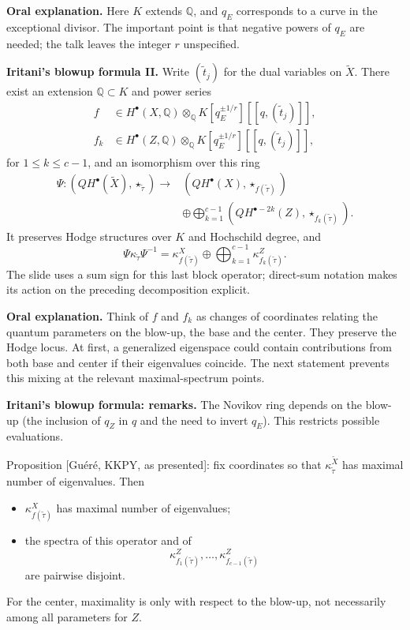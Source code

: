 \textbf{Oral explanation.}
Here $K$ extends $\mathbb Q$, and $q_E$
corresponds to a curve in the exceptional
divisor. The important point is that
negative powers of $q_E$ are needed;
the talk leaves the integer $r$ unspecified.

\medskip\noindent
\textbf{Iritani's blowup formula II.}
Write $(\widetilde t_j)$ for the dual
variables on $\widetilde X$.
There exist an extension
$\mathbb Q\subset K$ and power series
$$
\begin{aligned}
f&\in H^\bullet(X,\mathbb Q)
\otimes_{\mathbb Q}
K[q_E^{\pm1/r}][[q,(\widetilde t_j)]],\\
f_k&\in H^\bullet(Z,\mathbb Q)
\otimes_{\mathbb Q}
K[q_E^{\pm1/r}][[q,(\widetilde t_j)]],
\end{aligned}
$$
for $1\leq k\leq c-1$, and an isomorphism
over this ring
$$
\begin{aligned}
\Psi:(QH^\bullet(\widetilde X),
\star_{\widetilde\tau})
\longrightarrow{}&
(QH^\bullet(X),\star_{f(\widetilde\tau)})\\
&\oplus\bigoplus_{k=1}^{c-1}
(QH^{\bullet-2k}(Z),
\star_{f_k(\widetilde\tau)}).
\end{aligned}
$$
It preserves Hodge structures over $K$
and Hochschild degree, and
$$
\Psi\kappa_{\widetilde\tau}\Psi^{-1}
=
\kappa^X_{f(\widetilde\tau)}
\oplus\bigoplus_{k=1}^{c-1}
\kappa^Z_{f_k(\widetilde\tau)}.
$$
The slide uses a sum sign for this last
block operator; direct-sum notation makes
its action on the preceding decomposition
explicit.

\textbf{Oral explanation.}
Think of $f$ and $f_k$ as changes of
coordinates relating the quantum parameters
on the blow-up, the base and the center.
They preserve the Hodge locus.
At first, a generalized eigenspace could
contain contributions from both base and
center if their eigenvalues coincide.
The next statement prevents this mixing
at the relevant maximal-spectrum points.

\medskip\noindent
\textbf{Iritani's blowup formula: remarks.}
The Novikov ring depends on the blow-up
(the inclusion of $q_Z$ in $q$ and the
need to invert $q_E$). This restricts
possible evaluations.

Proposition [Gu\'er\'e, KKPY, as presented]:
fix coordinates so that
$\kappa_{\widetilde\tau}^{\widetilde X}$
has maximal number of eigenvalues. Then
\begin{itemize}
\item $\kappa^X_{f(\widetilde\tau)}$ has
maximal number of eigenvalues;
\item the spectra of this operator and of
$$
\kappa^Z_{f_1(\widetilde\tau)},\ldots,
\kappa^Z_{f_{c-1}(\widetilde\tau)}
$$
are pairwise disjoint.
\end{itemize}
For the center, maximality is only with
respect to the blow-up, not necessarily
among all parameters for $Z$.


